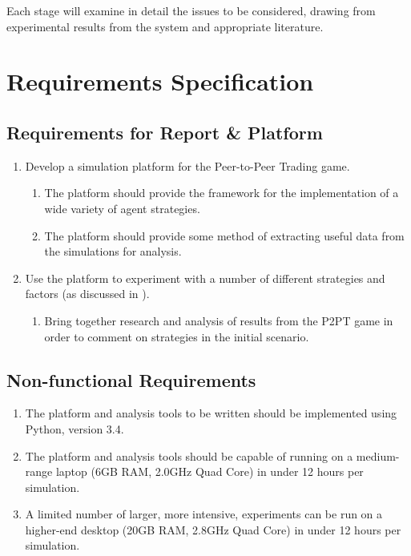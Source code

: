 \documentclass{article}
\begin{document}
Each stage will examine in detail the issues to be considered, drawing from experimental results from the system and appropriate literature.

\section{Requirements Specification}
\label{sec:requirements-spec}
\subsection{Requirements for Report \& Platform}
\begin{enumerate}
	\item Develop a simulation platform for the Peer-to-Peer Trading game.
	\begin{enumerate}
		\item The platform should provide the framework for the implementation of a wide variety of agent strategies.
		\item The platform should provide some method of extracting useful data from the simulations for analysis.
	\end{enumerate}
	\item Use the platform to experiment with a number of different strategies and factors (as discussed in ).
	\begin{enumerate}
		\item Bring together research and analysis of results from the P2PT game in order to comment on strategies in the initial scenario.
	\end{enumerate}
\end{enumerate}

\subsection{Non-functional Requirements}
\label{sec:non-functional}
\begin{enumerate}
	\item The platform and analysis tools to be written should be implemented using Python, version 3.4.
	\item The platform and analysis tools should be capable of running on a medium-range laptop (6GB RAM, 2.0GHz Quad Core) in under 12 hours per simulation.
	\item A limited number of larger, more intensive, experiments can be run on a higher-end desktop (20GB RAM, 2.8GHz Quad Core) in under 12 hours per simulation.
\end{enumerate}
\end{document}
